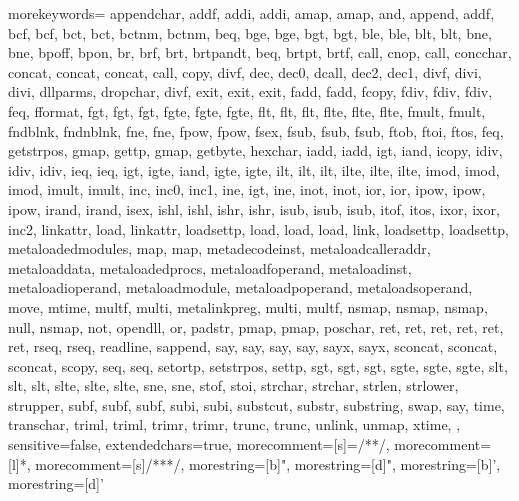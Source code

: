 {morekeywords={
appendchar,
addf,
addi,
addi,
amap,
amap,
and,
append,
addf,
bcf,
bcf,
bct,
bct,
bctnm,
bctnm,
beq,
bge,
bge,
bgt,
bgt,
ble,
ble,
blt,
blt,
bne,
bne,
bpoff,
bpon,
br,
brf,
brt,
brtpandt,
beq,
brtpt,
brtf,
call,
cnop,
call,
concchar,
concat,
concat,
concat,
call,
copy,
divf,
dec,
dec0,
dcall,
dec2,
dec1,
divf,
divi,
divi,
dllparms,
dropchar,
divf,
exit,
exit,
exit,
fadd,
fadd,
fcopy,
fdiv,
fdiv,
fdiv,
feq,
fformat,
fgt,
fgt,
fgt,
fgte,
fgte,
fgte,
flt,
flt,
flt,
flte,
flte,
flte,
fmult,
fmult,
fndblnk,
fndnblnk,
fne,
fne,
fpow,
fpow,
fsex,
fsub,
fsub,
fsub,
ftob,
ftoi,
ftos,
feq,
getstrpos,
gmap,
gettp,
gmap,
getbyte,
hexchar,
iadd,
iadd,
igt,
iand,
icopy,
idiv,
idiv,
idiv,
ieq,
ieq,
igt,
igte,
iand,
igte,
igte,
ilt,
ilt,
ilt,
ilte,
ilte,
ilte,
imod,
imod,
imod,
imult,
imult,
inc,
inc0,
inc1,
ine,
igt,
ine,
inot,
inot,
ior,
ior,
ipow,
ipow,
ipow,
irand,
irand,
isex,
ishl,
ishl,
ishr,
ishr,
isub,
isub,
isub,
itof,
itos,
ixor,
ixor,
inc2,
linkattr,
load,
linkattr,
loadsettp,
load,
load,
load,
link,
loadsettp,
loadsettp,
metaloadedmodules,
map,
map,
metadecodeinst,
metaloadcalleraddr,
metaloaddata,
metaloadedprocs,
metaloadfoperand,
metaloadinst,
metaloadioperand,
metaloadmodule,
metaloadpoperand,
metaloadsoperand,
move,
mtime,
multf,
multi,
metalinkpreg,
multi,
multf,
nsmap,
nsmap,
nsmap,
null,
nsmap,
not,
opendll,
or,
padstr,
pmap,
pmap,
poschar,
ret,
ret,
ret,
ret,
ret,
ret,
rseq,
rseq,
readline,
sappend,
say,
say,
say,
say,
sayx,
sayx,
sconcat,
sconcat,
sconcat,
scopy,
seq,
seq,
setortp,
setstrpos,
settp,
sgt,
sgt,
sgt,
sgte,
sgte,
sgte,
slt,
slt,
slt,
slte,
slte,
slte,
sne,
sne,
stof,
stoi,
strchar,
strchar,
strlen,
strlower,
strupper,
subf,
subf,
subf,
subi,
subi,
substcut,
substr,
substring,
swap,
say,
time,
transchar,
triml,
triml,
trimr,
trimr,
trunc,
trunc,
unlink,
unmap,
xtime,
  },
sensitive=false,
extendedchars=true,
morecomment=[s]={/*}{*/},
morecomment=[l]{*},
morecomment=[s]{/**}{*/},
morestring=[b]",
morestring=[d]",
morestring=[b]',
morestring=[d]'}

